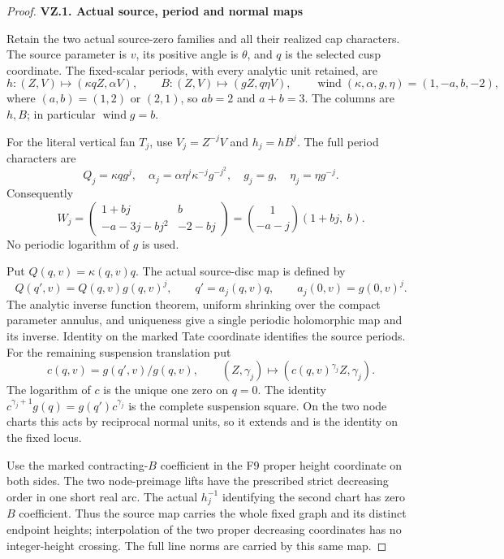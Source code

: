 \begin{proof}
\par

\medskip\noindent\textbf{VZ.1. Actual source, period and normal maps}

\par\nobreak

Retain the two actual source-zero families and all their realized cap
characters. The source parameter is \(v\), its positive angle is
\(\theta\), and \(q\) is the selected cusp coordinate. The fixed-scalar
periods, with every analytic unit retained, are
\[
 h:(Z,V)\longmapsto(\kappa qZ,\alpha V),\qquad
 B:(Z,V)\longmapsto(gZ,q\eta V),\qquad
 \operatorname{wind}(\kappa,\alpha,g,\eta)=(1,-a,b,-2),
\]
where \((a,b)=(1,2)\) or \((2,1)\), so \(ab=2\) and \(a+b=3\).
The columns are \(h,B\); in particular \(\operatorname{wind}g=b\).

For the literal vertical fan \(T_j\), use \(V_j=Z^{-j}V\) and
\(h_j=hB^j\). The full period characters are
\[
 Q_j=\kappa qg^j,\quad
 \alpha_j=\alpha\eta^j\kappa^{-j}g^{-j^2},\quad
 g_j=g,\quad \eta_j=\eta g^{-j}.                       \tag{VZ.1}
\]
Consequently
\[
 W_j=
 \begin{pmatrix}1+bj&b\\-a-3j-bj^2&-2-bj\end{pmatrix}
 =\binom1{-a-j}(1+bj,\ b).                            \tag{VZ.2}
\]
No periodic logarithm of \(g\) is used.

Put \(Q(q,v)=\kappa(q,v)q\). The actual source-disc map is defined by
\[
 Q(q',v)=Q(q,v)g(q,v)^j,\qquad
 q'=a_j(q,v)q,\qquad a_j(0,v)=g(0,v)^j.                \tag{VZ.3}
\]
The analytic inverse function theorem, uniform shrinking over the compact
parameter annulus, and uniqueness give a single periodic holomorphic map
and its inverse. Identity on the marked Tate coordinate identifies the
source periods. For the remaining suspension translation put
\[
 c(q,v)=g(q',v)/g(q,v),\qquad
 (Z,\gamma_j)\longmapsto(c(q,v)^{\gamma_j}Z,\gamma_j).
                                                               \tag{VZ.4}
\]
The logarithm of \(c\) is the unique one zero on \(q=0\). The identity
\(c^{\gamma_j+1}g(q)=g(q')c^{\gamma_j}\) is the complete suspension
square. On the two node charts this acts by reciprocal normal units,
so it extends and is the identity on the fixed locus.

Use the marked contracting-\(B\) coefficient in the F9 proper height
coordinate on both sides. The two node-preimage lifts have the prescribed
strict decreasing order in one short real arc. The actual \(h_j^{-1}\)
identifying the second chart has zero \(B\) coefficient. Thus the
source map carries the whole fixed graph and its distinct endpoint
heights; interpolation of the two proper decreasing coordinates has
no integer-height crossing. The full line norms are carried by this
same map.


\end{proof}
